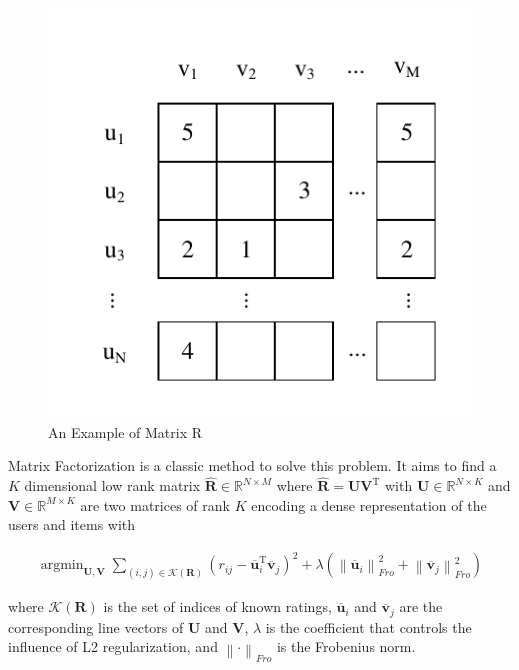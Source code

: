 \documentclass{sig-alternate-05-2015}
\DeclareMathOperator*{\argmin}{argmin}
\begin{document}
\begin{figure}[htbp]
	\centering
	\includegraphics{images/3.pdf}
	\caption{An Example of Matrix R}
	\label{fig:matrix}
\end{figure}

Matrix Factorization is a classic method to solve this problem.
It aims to find a $K$ dimensional low rank matrix $\mathbf{\hat{R}} \in \mathbb{R}^{N \times M}$
where $\mathbf{\hat{R}} = \mathbf{U} \mathbf{V}^\mathrm{T}$ with
$\mathbf{U} \in \mathbb{R}^{N \times K}$ and $\mathbf{V} \in \mathbb{R}^{M \times K}$
are two matrices of rank $K$ encoding a dense representation of the users and items with

\begin{equation}
\begin{aligned}
	\argmin_{\mathbf{U},\mathbf{V}}
	\sum_{(i,j) \in \mathcal{K}(\mathbf{R})}
	( r_{ij} - \overline{\mathbf{u}}_i^{\mathrm{T}} \overline{\mathbf{v}}_j ) ^ 2 +
	\lambda ( \left\| \overline{\mathbf{u}}_i \right\|_{Fro}^2 +
	\left\| \overline{\mathbf{v}}_j \right\|_{Fro}^2 )
\end{aligned}
\end{equation}

where $\mathcal{K}(\mathbf{R})$ is the set of indices of known ratings,
$\overline{\mathbf{u}}_i$ and $\overline{\mathbf{v}}_j$
are the corresponding line vectors of $\mathbf{U}$ and $\mathbf{V}$,
$\lambda$ is the coefficient that controls the influence of L2 regularization,
and $\left\| \cdot \right\|_{Fro}$ is the Frobenius norm.
\end{document}
